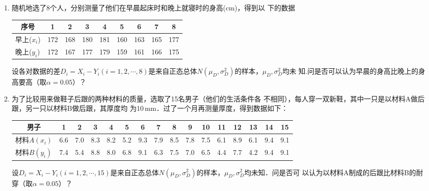 \documentclass[10pt,a4paper]{article}
\begin{document}
\begin{enumerate}
    \item 随机地选了8个人，分别测量了他们在早晨起床时和晚上就寝时的身高(cm)，得到以
    下的数据
    \renewcommand{\arraystretch}{1.3}
    \begin{table}[H]\centering
        \begin{tabular}{c|cccccccc}
        \hline
        序号                             & 1                       & 2                       & 3                       & 4   & 5   & 6   & 7   & 8   \\ \hline
        早上($x_i$)                      & 172                     & 168                     & 180                     & 181 & 160 & 163 & 165 & 177 \\ \hline
        \multicolumn{1}{l|}{晚上($y_i$)} & \multicolumn{1}{l}{172} & \multicolumn{1}{l}{167} & \multicolumn{1}{l}{177} & 179 & 159 & 161 & 166 & 175 \\ \hline
        \end{tabular}
    \end{table}
    \renewcommand{\arraystretch}{1.0}
    设各对数据的差$D_i=X_i-Y_i(i=1,2,\cdots,8)$是来自正态总体$N(\mu_D,\sigma^2_D)$的样本，$\mu_D,\sigma^2_D$均未
    知.问是否可以认为早晨的身高比晚上的身高要高（取$\alpha=0.05$）？
    \clearpage



    \item 为了比较用来做鞋子后跟的两种材料的质量，选取了15名男子（他们的生活条件各
    不相同），每人穿一双新鞋，其中一只是以材料A做后跟，另一只以材料B做后跟，其厚度均
    为10$\, $mm．过了一个月再测量厚度，得到数据如下：
    \renewcommand{\arraystretch}{1.3}
    \begin{table}[H]\centering
        \begin{tabular}{c|ccccccccccccccc}
        \hline
        男子                              & 1                       & 2                       & 3                       & 4   & 5   & 6   & 7   & 8   & 9   & 10  & 11  & 12  & 13  & 14  & 15  \\ \hline
        材料$A(x_i)$                      & 6.6                     & 7.0                     & 8.3                     & 8.2 & 5.2 & 9.3 & 7.9 & 8.5 & 7.8 & 7.5 & 6.1 & 8.9 & 6.1 & 9.4 & 9.1 \\ \hline
        \multicolumn{1}{l|}{材料$B(y_i)$} & \multicolumn{1}{l}{7.4} & \multicolumn{1}{l}{5.4} & \multicolumn{1}{l}{8.8} & 8.0 & 6.8 & 9.1 & 6.3 & 7.5 & 7.0 & 6.5 & 4.4 & 7.7 & 4.2 & 9.4 & 9.1 \\ \hline
        \end{tabular}
    \end{table}
    \renewcommand{\arraystretch}{1.0}
    设$D_i=X_i-Y_i(i=1,2,\cdots,15)$是来自正态总体$N(\mu_D,\sigma^2_D)$的样本，$\mu_D,\sigma^2_D$均未知．问是否可
    以认为以材料A制成的后跟比材料B的耐穿（取$\alpha=0.05$）？
    \clearpage




\end{enumerate}
\end{document}
